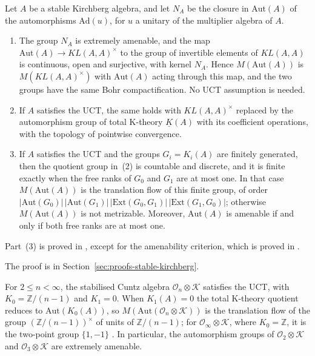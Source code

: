 \begin{theorem}\label{thm:lupini-stable}
Let $A$ be a stable Kirchberg algebra, and let $N_A$ be the closure in
$\mathrm{Aut}(A)$ of the automorphisms $\mathrm{Ad}(u)$, for $u$ a unitary of
the multiplier algebra of $A$.
\begin{enumerate}
\item The group $N_A$ is extremely amenable, and the map
  $\mathrm{Aut}(A)\to KL(A,A)^\times$ to the group of invertible elements of
  $KL(A,A)$ is continuous, open and surjective, with kernel $N_A$. Hence
  $M(\mathrm{Aut}(A))$ is $M(KL(A,A)^\times)$ with $\mathrm{Aut}(A)$ acting
  through this map, and the two groups have the same Bohr compactification.
  No UCT assumption is needed.
\item If $A$ satisfies the UCT, the same holds with $KL(A,A)^\times$ replaced
  by the automorphism group of total K-theory $\underline{K}(A)$ with its
  coefficient operations, with the topology of pointwise convergence.
\item If $A$ satisfies the UCT and the groups $G_i=K_i(A)$ are finitely
  generated, then the quotient group in~(2) is countable and discrete, and it
  is finite exactly when the free ranks of $G_0$ and $G_1$ are at most one. In
  that case $M(\mathrm{Aut}(A))$ is the translation flow of this finite group,
  of order
  $|\mathrm{Aut}(G_0)|\,|\mathrm{Aut}(G_1)|\,|\mathrm{Ext}(G_0,G_1)|\,|\mathrm{Ext}(G_1,G_0)|$;
  otherwise $M(\mathrm{Aut}(A))$ is not metrizable. Moreover,
  $\mathrm{Aut}(A)$ is amenable if and only if both free ranks are at most
  one.
\end{enumerate}
Part~(3) is proved in \cite{LupiniCuntz2026}, except for the amenability
criterion, which is proved in \cite{LupiniStable2026}.
\end{theorem}

The proof is in Section~\ref{sec:proofs-stable-kirchberg}.

\begin{example}\label{ex:lupini-stable-cuntz}
For $2\leq n<\infty$, the stabilised Cuntz algebra $\mathcal{O}_n\otimes\mathcal{K}$
satisfies the UCT, with $K_0=\mathbb{Z}/(n-1)$ and $K_1=0$. When $K_1(A)=0$
the total K-theory quotient reduces to $\mathrm{Aut}(K_0(A))$, so
$M(\mathrm{Aut}(\mathcal{O}_n\otimes\mathcal{K}))$ is the translation flow of
the group $(\mathbb{Z}/(n-1))^\times$ of units of $\mathbb{Z}/(n-1)$; for
$\mathcal{O}_\infty\otimes\mathcal{K}$, where $K_0=\mathbb{Z}$, it is the
two-point group $\{1,-1\}$ \cite{LupiniCuntz2026}. In particular, the
automorphism groups of $\mathcal{O}_2\otimes\mathcal{K}$ and
$\mathcal{O}_3\otimes\mathcal{K}$ are extremely amenable.
\end{example}

